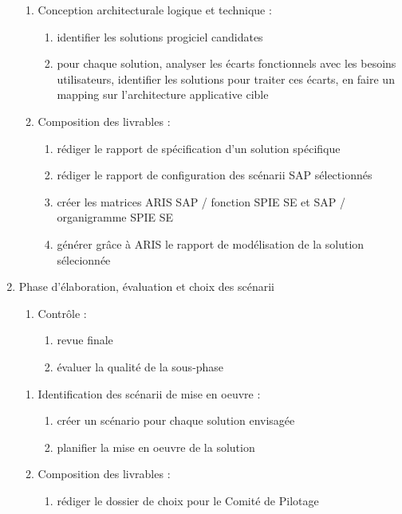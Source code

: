 \begin{enumerate}
\begin{enumerate}
            \item Conception architecturale logique et technique : 
                \begin{enumerate}
                  \item identifier les solutions progiciel candidates 
                  \item pour chaque solution, analyser les écarts fonctionnels avec les besoins utilisateurs, identifier les solutions pour traiter ces écarts, en faire un mapping sur l'architecture applicative cible
                \end{enumerate}
            \item Composition des livrables : 
                \begin{enumerate}
                  \item rédiger le rapport de spécification d'un solution spécifique 
                  \item rédiger le rapport de configuration des scénarii SAP sélectionnés
                  \item créer les matrices ARIS SAP / fonction SPIE SE et SAP / organigramme SPIE SE
                  \item générer grâce à ARIS le rapport de modélisation de la solution sélecionnée
                \end{enumerate}
          \end{enumerate}

    \item Phase d'élaboration, évaluation et choix des scénarii

          \begin{enumerate}
            \item Contrôle :
                \begin{enumerate}
                  \item revue finale
                  \item évaluer la qualité de la sous-phase
                \end{enumerate}
          \end{enumerate}

          \begin{enumerate}
            \item Identification des scénarii de mise en oeuvre : 
                \begin{enumerate}
                  \item créer un scénario pour chaque solution envisagée
                  \item planifier la mise en oeuvre de la solution
                \end{enumerate}
            \item Composition des livrables : 
                \begin{enumerate}
                  \item rédiger le dossier de choix pour le Comité de Pilotage
                \end{enumerate}
          \end{enumerate}


\end{enumerate}
